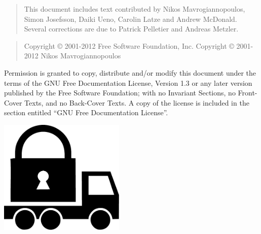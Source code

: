 \thispagestyle{empty}

\begin{quotation}
This document includes text contributed by
Nikos Mavrogiannopoulos, Simon Josefsson, Daiki Ueno, 
Carolin Latze and Andrew McDonald. Several corrections are due
to Patrick Pelletier and Andreas Metzler.
\end{quotation}



\begin{quotation}
Copyright \copyright{} 2001-2012 Free Software Foundation, Inc.
Copyright \copyright{} 2001-2012 Nikos Mavrogiannopoulos
\end{quotation}

\begin{flushleft}
Permission is granted to copy, distribute and/or modify this document
under the terms of the GNU Free Documentation License, Version 1.3 or
any later version published by the Free Software Foundation; with no
Invariant Sections, no Front-Cover Texts, and no Back-Cover Texts.  A
copy of the license is included in the section entitled ``GNU Free
Documentation License''.
\end{flushleft}

\newpage
\thispagestyle{empty}

\begin{center}
\includegraphics[width=6cm]{../gnutls-logo.pdf}
\end{center}


